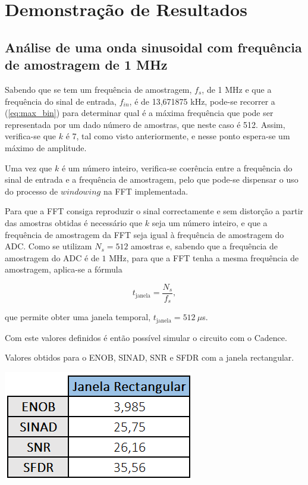 \documentclass[11pt]{article}
\numberwithin{equation}{section}
\begin{document}
\section{Demonstração de Resultados}

\subsection{Análise de uma onda sinusoidal com frequência de amostragem de 1 MHz}

Sabendo que se tem um frequência de amostragem, $f_{s}$, de 1 MHz e que a frequência do sinal de entrada, $f_{in}$, é de 13,671875 kHz, pode-se recorrer a (\ref{eq:max_bin}) para determinar qual é a máxima frequência que pode ser representada por um dado número de amostras, que neste caso é 512. Assim, verifica-se que $k$ é 7, tal como visto anteriormente, e nesse ponto espera-se um máximo de amplitude.

Uma vez que $k$ é um número inteiro, verifica-se coerência entre a frequência do sinal de entrada e a frequência de amostragem, pelo que pode-se dispensar o uso do processo de $windowing$ na FFT implementada.

Para que a FFT consiga reproduzir o sinal correctamente e sem distorção a partir das amostras obtidas é necessário que $k$ seja um número inteiro, e que a frequência de amostragem da FFT seja igual à frequência de amostragem do ADC. Como se utilizam $N_{s} = 512$ amostras e, sabendo que a frequência de amostragem do ADC é de $1$ MHz, para que a FFT tenha a mesma frequência de amostragem, aplica-se a fórmula 

\vspace{-3mm}
\begin{equation}
 	t_{\text{janela}} = \frac{N_{s}}{f_{s}},
 	\label{eq:temp_jan}
\end{equation}

\vspace{1mm}
que permite obter uma janela temporal, $t_{\text{janela}} = 512~\mu$s.

Com este valores definidos é então possível simular o circuito com o Cadence.

\begin{table}[h]
	\centering
	\caption{Valores obtidos para o ENOB, SINAD, SNR e SFDR com a janela rectangular.}
 	\includegraphics[keepaspectratio=true, scale=0.50]{lab/rect.png}
\end{table}
\end{document}
